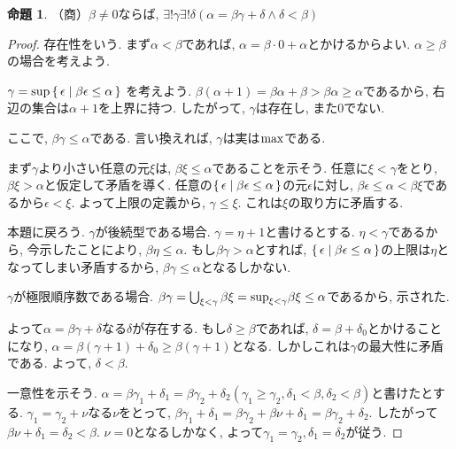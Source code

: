 \documentclass[a4paper, twoside]{bxjsarticle}
\theoremstyle{definition}
\newtheorem{prop}[thm]{命題}
\begin{document}
        \begin{prop}
            （商）$\beta\neq0$ならば, $\exists !\gamma \exists !\delta(\alpha=\beta\gamma+\delta\land\delta<\beta)$
        \end{prop}
        \begin{proof}
            存在性をいう. まず$\alpha<\beta$であれば, $\alpha=\beta\cdot0+\alpha$とかけるからよい. $\alpha\geq\beta$の場合を考えよう.
            
            $\gamma={\rm sup}\set{\epsilon|\beta\epsilon\leq\alpha}$ を考えよう. $\beta(\alpha+1)=\beta\alpha+\beta>\beta\alpha\geq\alpha$であるから, 右辺の集合は$\alpha+1$を上界に持つ. したがって, $\gamma$は存在し, また0でない.
            
            ここで, $\beta\gamma\leq\alpha$である. 言い換えれば, $\gamma$は実は${\rm max}$である.
            \begin{framed}
                まず$\gamma$より小さい任意の元$\xi$は, $\beta\xi\leq\alpha$であることを示そう. 任意に$\xi<\gamma$をとり, $\beta\xi>\alpha$と仮定して矛盾を導く. 任意の$\set{\epsilon|\beta\epsilon\leq\alpha}$の元$\epsilon$に対し, $\beta\epsilon\leq\alpha<\beta\xi$であるから$\epsilon<\xi$. よって上限の定義から, $\gamma\leq\xi$. これは$\xi$の取り方に矛盾する.
                
                本題に戻ろう. $\gamma$が後続型である場合. $\gamma=\eta+1$と書けるとする. $\eta<\gamma$であるから, 今示したことにより, $\beta\eta\leq\alpha$. もし$\beta\gamma>\alpha$とすれば, $\set{\epsilon|\beta\epsilon\leq\alpha}$の上限は$\eta$となってしまい矛盾するから, $\beta\gamma\leq\alpha$となるしかない.
                
                $\gamma$が極限順序数である場合. $\beta\gamma=\bigcup_{\xi<\gamma}\beta\xi={\rm sup}_{\xi<\gamma}\beta\xi\leq\alpha$であるから, 示された.
            \end{framed}
            
            よって$\alpha=\beta\gamma+\delta$なる$\delta$が存在する. もし$\delta\geq\beta$であれば, $\delta=\beta+\delta_0$とかけることになり, $\alpha=\beta(\gamma+1)+\delta_0\geq\beta(\gamma+1)$となる. しかしこれは$\gamma$の最大性に矛盾である. よって, $\delta<\beta$.
            
            一意性を示そう. $\alpha=\beta\gamma_1+\delta_1=\beta\gamma_2+\delta_2 (\gamma_1\geq\gamma_2, \delta_1<\beta, \delta_2<\beta)$と書けたとする. $\gamma_1=\gamma_2+\nu$なる$\nu$をとって, $\beta\gamma_1+\delta_1=\beta\gamma_2+\beta\nu+\delta_1=\beta\gamma_2+\delta_2$. したがって$\beta\nu+\delta_1=\delta_2<\beta$. $\nu=0$となるしかなく, よって$\gamma_1=\gamma_2, \delta_1=\delta_2$が従う.
        \end{proof}
\end{document}

